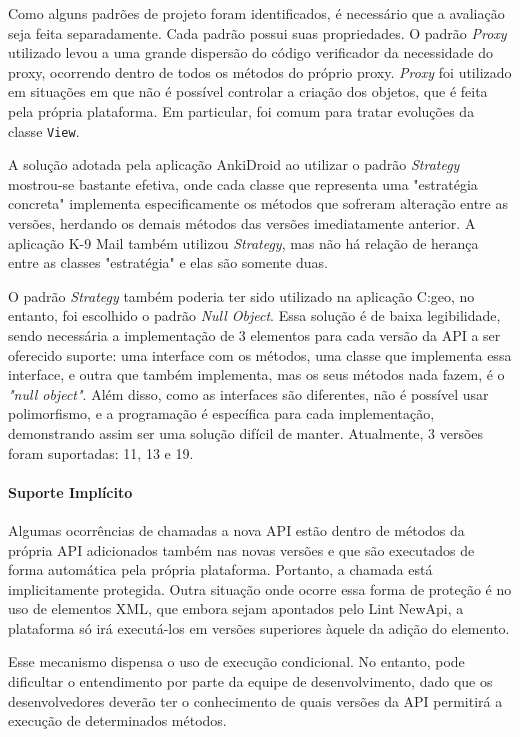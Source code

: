 Como alguns padrões de projeto foram identificados, é necessário que a avaliação
seja feita separadamente. Cada padrão possui suas propriedades. O padrão
\textit{Proxy} utilizado levou a uma grande dispersão do código verificador da
necessidade do proxy, ocorrendo dentro de todos os métodos do próprio proxy.
\textit{Proxy} foi utilizado em situações em que não é possível controlar a criação
dos objetos, que é feita pela própria plataforma. Em particular, foi comum para
tratar evoluções da classe \texttt{View}.

A solução adotada pela aplicação AnkiDroid ao utilizar o padrão \textit{Strategy}
mostrou-se bastante efetiva, onde cada classe que representa uma "estratégia concreta"
implementa especificamente os métodos que sofreram alteração entre as versões, herdando
os demais métodos das versões imediatamente anterior. A aplicação K-9 Mail também utilizou
\textit{Strategy}, mas não há relação de herança entre as classes "estratégia" e elas são
somente duas.

O padrão \textit{Strategy} também poderia ter sido utilizado na aplicação C:geo,
no entanto, foi escolhido o padrão \textit{Null Object}. Essa solução é de baixa
legibilidade, sendo necessária a implementação de 3 elementos para cada versão da
API a ser oferecido suporte: uma interface com os métodos, uma classe que implementa
essa interface, e outra que também implementa, mas os seus métodos nada fazem, é o
\textit{"null object"}. Além disso, como as interfaces são diferentes, não é possível
usar polimorfismo, e a programação é específica para cada implementação, demonstrando
assim ser uma solução difícil de manter. Atualmente, 3 versões foram suportadas:
11, 13 e 19.

\paragraph{Suporte Implícito}

Algumas ocorrências de chamadas a nova API estão dentro de métodos da própria API
adicionados também nas novas versões e que são executados de forma automática pela
própria plataforma. Portanto, a chamada está implicitamente protegida. Outra situação
onde ocorre essa forma de proteção é no uso de elementos XML, que embora sejam apontados
pelo Lint NewApi, a plataforma só irá executá-los em versões superiores àquele da adição
do elemento. 

Esse mecanismo dispensa o uso de execução condicional. No entanto, pode dificultar o
entendimento por parte da equipe de desenvolvimento, dado que os desenvolvedores deverão
ter o conhecimento de quais versões da API permitirá a execução de determinados métodos.

